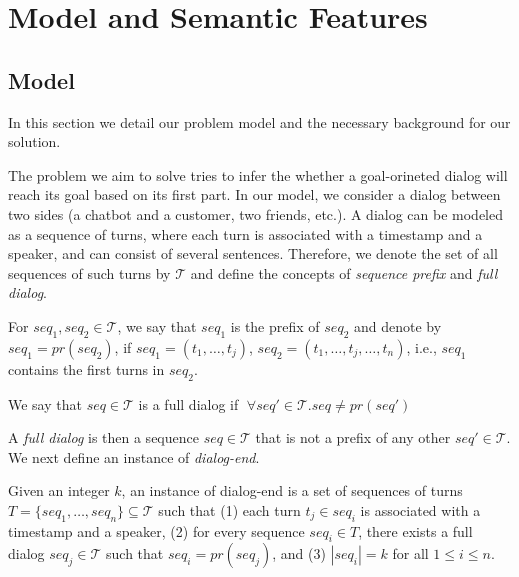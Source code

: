 \section{Model and Semantic Features}\label{sec:model}

\subsection{Model}
In this section we detail our problem model and the necessary background 
for our solution.

The problem we aim to solve 
tries to infer the whether a goal-orineted dialog will reach its goal based on its first part. 
In our model, we consider a dialog between two sides (a chatbot and a customer, two friends, etc.). 
A dialog can be modeled as a sequence of turns, 
where each turn is associated with a timestamp and a speaker, and can consist of several sentences. 
Therefore, we denote the set of all sequences of 
such turns by $\mathcal{T}$ and define the concepts of {\em sequence prefix} and {\em full dialog}. 

\begin{definition}
For $seq_1, seq_2 \in \mathcal{T}$, we say that $seq_1$ is the 
prefix of $seq_2$ and denote by $seq_1 = pr(seq_2)$, if 
$seq_1 = (t_1, \ldots, t_j)$, $seq_2 = (t_1, \ldots, t_j, \ldots, t_n)$, i.e., $seq_1$ contains the first 
turns in $seq_2$. 

We say that $seq \in \mathcal{T}$ is a full dialog if $\;\forall seq' \in \mathcal{T}. seq \neq pr(seq')\; $ 
\end{definition}

A {\em full dialog} is then a sequence $seq \in \mathcal{T}$ that is not a prefix 
of any other $seq' \in \mathcal{T}$. 
We next define an instance of {\em dialog-end}. 

\begin{definition}\label{def:target}
Given an integer $k$, an instance of dialog-end is a set of sequences of turns $T=\{seq_1, \ldots, seq_n\} \subseteq \mathcal{T}$ such that 
(1) each turn $t_j \in seq_i$ is associated with a timestamp and a speaker, (2) for every sequence $seq_i\in T$, there exists a full dialog $seq_j\in \mathcal{T}$ such that $seq_i = pr(seq_j)$, and (3) $|seq_i| = k$ for all $1\leq i \leq n$.
\end{definition}

